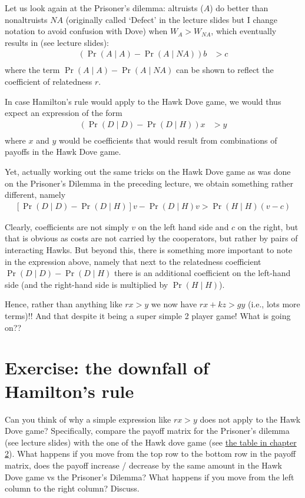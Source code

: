\documentclass[
]{book}
\begin{document}
Let us look again at the Prisoner's dilemma: altruists (\(A\)) do better than nonaltruists \(NA\) (originally called `Defect' in the lecture slides but I change notation to avoid confusion with Dove) when \(W_{A} > W_{NA}\), which eventually results in (see lecture slides):
\begin{align}
\left( \Pr(A \mid A ) - \Pr(A \mid NA ) \right ) b &> c \\
\end{align}
where the term \(\Pr(A \mid A ) - \Pr(A \mid NA )\) can be shown to reflect the coefficient of relatedness \(r\).

In case Hamilton's rule would apply to the Hawk Dove game, we would thus expect an expression of the form
\begin{align}
\left(\Pr(D \mid D) - \Pr(D \mid H ) \right ) x &> y \\
\end{align}
where \(x\) and \(y\) would be coefficients that would result from combinations of payoffs in the Hawk Dove game.

Yet, actually working out the same tricks on the Hawk Dove game as was done on the Prisoner's Dilemma in the preceding lecture, we obtain something rather different, namely
\begin{align}
\left [ \Pr (D \mid D) - \Pr ( D \mid H) \right ] v - \Pr (D \mid H) v > \Pr ( H \mid H ) \left (v - c \right )
\end{align}

Clearly, coefficients are not simply \(v\) on the left hand side and \(c\) on the right, but that is obvious as costs are not carried by the cooperators, but rather by pairs of interacting Hawks. But beyond this, there is something more important to note in the expression above, namely that next to the relatedness coefficient \(\Pr(D \mid D) - \Pr(D \mid H )\) there is an additional coefficient on the left-hand side (and the right-hand side is multiplied by \(\Pr(H\mid H)\)).

Hence, rather than anything like \(r x > y\) we now have \(r x + k z > g y\) (i.e., lots more terms)!! And that despite it being a super simple 2 player game! What is going on??

\section{Exercise: the downfall of Hamilton's rule}\label{exercise-the-downfall-of-hamiltons-rule}

Can you think of why a simple expression like \(r x > y\) does not apply to the Hawk Dove game? Specifically, compare the payoff matrix for the Prisoner's dilemma (see lecture slides) with the one of the Hawk dove game (see \hyperref[tab:payoffHD]{the table in chapter 2}). What happens if you move from the top row to the bottom row in the payoff matrix, does the payoff increase / decrease by the same amount in the Hawk Dove game vs the Prisoner's Dilemma? What happens if you move from the left column to the right column? Discuss.
\end{document}
